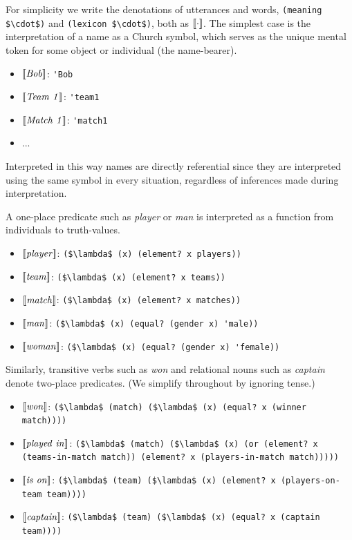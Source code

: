 \documentclass[pdfextras]{handbook}
\newcommand{\llbracket}{\ensuremath{\left [\!\left [}}%
\newcommand{\rrbracket}{\ensuremath{\right ]\!\right ]}}
\providecommand{\sv}[1]{\ensuremath{\llbracket \mathit{#1} \rrbracket}}
\newcommand{\denot}[1]{\ensuremath{\llbracket \mathit{#1} \rrbracket}}
\begin{document}
For simplicity we write the denotations of utterances and words, \lstinline[mathescape]{(meaning $\cdot$)} and \lstinline[mathescape]{(lexicon $\cdot$)}, both as \denot{\cdot}.
The simplest case is the interpretation of a name as a Church symbol, which serves as the unique mental token for some object or individual (the name-bearer).
\begin{itemize}
\item \sv{Bob}: \lstinline{'Bob} 
\item \sv{Team\ 1}: \lstinline{'team1} 
\item \sv{Match\ 1}: \lstinline{'match1}
\item ...
\end{itemize}
Interpreted in this way names are directly referential since they are interpreted using the same symbol in every situation, regardless of inferences made during interpretation. 

A one-place predicate such as \emph{player} or \emph{man} is interpreted as a function from individuals to truth-values. 
\begin{itemize}
\item  \sv{player}: \lstinline[mathescape]{($\lambda$ (x) (element? x players))}
\item \sv{team}: \lstinline[mathescape]{($\lambda$ (x) (element? x teams))}
\item \sv{match}: \lstinline[mathescape]{($\lambda$ (x) (element? x matches))}
\item \sv{man}: \lstinline[mathescape]{($\lambda$ (x) (equal? (gender x) 'male))}
\item \sv{woman}: \lstinline[mathescape]{($\lambda$ (x) (equal? (gender x) 'female))}
\end{itemize}
Similarly, transitive verbs such as \emph{won} and relational nouns such as \emph{captain} denote two-place predicates. (We simplify throughout by ignoring tense.)
\begin{itemize}
\item  \sv{won}: \lstinline[mathescape]{($\lambda$ (match) ($\lambda$ (x) (equal? x (winner match))))}
\item \sv{played\ in}:  \lstinline[mathescape]{($\lambda$ (match) ($\lambda$ (x) (or (element? x (teams-in-match match)) (element? x (players-in-match match)))))}
\item \sv{is\ on}:  \lstinline[mathescape]{($\lambda$ (team) ($\lambda$ (x) (element? x (players-on-team team))))}
\item \sv{captain}: \lstinline[mathescape]{($\lambda$ (team) ($\lambda$ (x) (equal? x (captain team))))}
\end{itemize}
\end{document}
